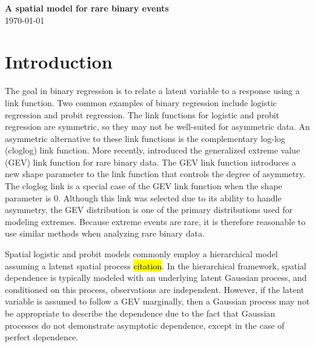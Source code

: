 \documentclass[11pt]{article}
\begin{document}
\linenumbers

\begin{center}
{\Large {\bf A spatial model for rare binary events}}\\
\today
\end{center}

\section{Introduction}\label{rbs:intro}

The goal in binary regression is to relate a latent variable to a response using a link function.
Two common examples of binary regression include logistic regression
and probit regression.
The link functions for logistic and probit regression are symmetric, so they may not be well-suited for asymmetric data.
An asymmetric alternative to these link functions is the complementary log-log (cloglog) link function.
More recently, \citet{Wang2010} introduced the generalized extreme value (GEV) link function for rare binary data.
The GEV link function introduces a new shape parameter to the link function that controls the degree of asymmetry.
The cloglog link is a special case of the GEV link function when the shape parameter is 0.
Although this link was selected due to its ability to handle asymmetry, the GEV distribution is one of the primary distributions used for modeling extremes.
Because extreme events are rare, it is therefore reasonable to use similar methods when analyzing rare binary data.

Spatial logistic and probit models commonly employ a hierarchical model assuming a latenst spatial process \hl{citation}.
In the hierarchical framework, spatial dependence is typically modeled with an underlying latent Gaussian process, and conditioned on this process, observations are independent.
However, if the latent variable is assumed to follow a GEV marginally, then a Gaussian process may not be appropriate to describe the dependence due to the fact that Gaussian processes do not demonstrate asymptotic dependence, except in the case of perfect dependence.
\end{document}
